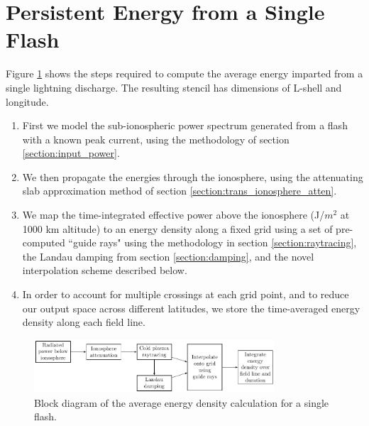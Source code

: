 \section{Persistent Energy from a Single Flash}
Figure \ref{fig:power_blockdiagram} shows the steps required to compute the average energy imparted from a single lightning discharge. The resulting stencil has dimensions of L-shell and longitude.
\begin{enumerate}
\item{First we model the sub-ionospheric power spectrum generated from a flash with a known peak current, using the methodology of section \ref{section:input_power}.}
\item{We then propagate the energies through the ionosphere, using the attenuating slab approximation method of section \ref{section:trans_ionosphere_atten}.}
\item{We map the time-integrated effective power above the ionosphere (J/$m^2$ at 1000 km altitude) to an energy density along a fixed grid using a set of pre-computed ``guide rays" using the methodology in section \ref{section:raytracing}, the Landau damping from section \ref{section:damping}, and the novel interpolation scheme described below.}
\item{In order to account for multiple crossings at each grid point, and to reduce our output space across different latitudes, we store the time-averaged energy density along each field line.}
 \end{enumerate}
\begin{figure}
\begin{center}
\includegraphics[width=0.8\textwidth]{figures/lightning_power_block_diagram.pdf}
\caption[Energy density calculation block diagram]{Block diagram of the average energy density calculation for a single flash.}
\label{fig:power_blockdiagram}
\end{center}
\end{figure}


